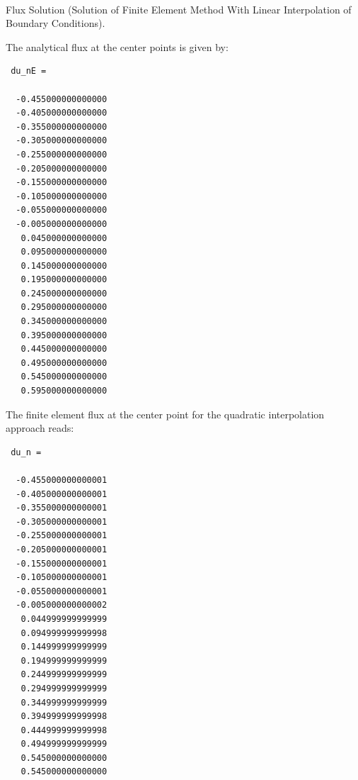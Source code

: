 \documentclass[a4paper,12pt]{article}
\makeatletter
\newenvironment{figurehere}
  {\def\@captype{figure}}
  {}
\makeatother
\begin{document}
\begin{center}
\begin{figurehere} 
\\
\caption{Flux Solution (Solution of Finite Element Method With Linear Interpolation of Boundary Conditions).}\label{fig:fluxlinCenter}
\end{figurehere}
\end{center}
The analytical flux at the center points is given by:
\begin{verbatim}
 du_nE =

  -0.455000000000000
  -0.405000000000000
  -0.355000000000000
  -0.305000000000000
  -0.255000000000000
  -0.205000000000000
  -0.155000000000000
  -0.105000000000000
  -0.055000000000000
  -0.005000000000000
   0.045000000000000
   0.095000000000000
   0.145000000000000
   0.195000000000000
   0.245000000000000
   0.295000000000000
   0.345000000000000
   0.395000000000000
   0.445000000000000
   0.495000000000000
   0.545000000000000
   0.595000000000000
\end{verbatim}
The finite element flux at the center point for the quadratic interpolation approach reads:
\begin{verbatim}
 du_n =

  -0.455000000000001
  -0.405000000000001
  -0.355000000000001
  -0.305000000000001
  -0.255000000000001
  -0.205000000000001
  -0.155000000000001
  -0.105000000000001
  -0.055000000000001
  -0.005000000000002
   0.044999999999999
   0.094999999999998
   0.144999999999999
   0.194999999999999
   0.244999999999999
   0.294999999999999
   0.344999999999999
   0.394999999999998
   0.444999999999998
   0.494999999999999
   0.545000000000000
   0.545000000000000
\end{verbatim}
\end{document}
